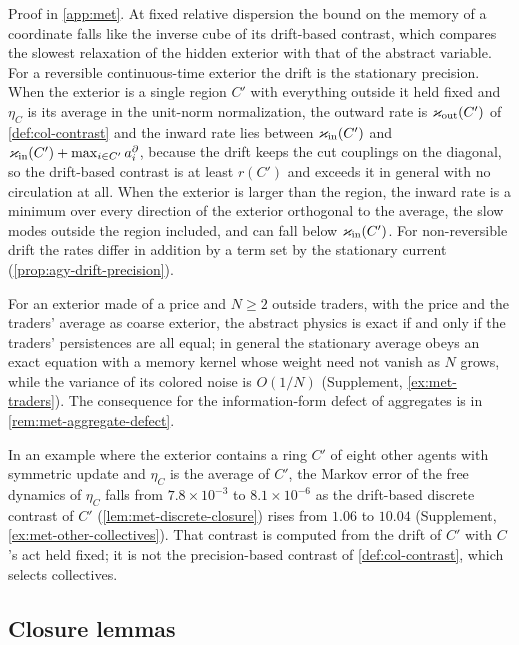 Proof in \cref{app:met}. At fixed relative dispersion the bound on the memory of a coordinate falls like the inverse cube of its drift-based contrast, which compares the slowest relaxation of the hidden exterior with that of the abstract variable. For a reversible continuous-time exterior the drift is the stationary precision. When the exterior is a single region $C'$ with everything outside it held fixed and $\eta_C$ is its average in the unit-norm normalization, the outward rate is $\varkappa_{\mathrm{out}}(C')$ of \cref{def:col-contrast} and the inward rate lies between $\varkappa_{\mathrm{in}}(C')$ and $\varkappa_{\mathrm{in}}(C')+\max_{i\in C'}a^\partial_i$, because the drift keeps the cut couplings on the diagonal, so the drift-based contrast is at least $r(C')$ and exceeds it in general with no circulation at all. When the exterior is larger than the region, the inward rate is a minimum over every direction of the exterior orthogonal to the average, the slow modes outside the region included, and can fall below $\varkappa_{\mathrm{in}}(C')$. For non-reversible drift the rates differ in addition by a term set by the stationary current (\cref{prop:agy-drift-precision}).

For an exterior made of a price and $N\ge2$ outside traders, with the price and the traders' average as coarse exterior, the abstract physics is exact if and only if the traders' persistences are all equal; in general the stationary average obeys an exact equation with a memory kernel whose weight need not vanish as $N$ grows, while the variance of its colored noise is $O(1/N)$ (Supplement, \cref{ex:met-traders}). The consequence for the information-form defect of aggregates is in \cref{rem:met-aggregate-defect}.

In an example where the exterior contains a ring $C'$ of eight other agents with symmetric update and $\eta_C$ is the average of $C'$, the Markov error of the free dynamics of $\eta_C$ falls from $7.8\times10^{-3}$ to $8.1\times10^{-6}$ as the drift-based discrete contrast of $C'$ (\cref{lem:met-discrete-closure}) rises from $1.06$ to $10.04$ (Supplement, \cref{ex:met-other-collectives}). That contrast is computed from the drift of $C'$ with $C$'s act held fixed; it is not the precision-based contrast of \cref{def:col-contrast}, which selects collectives.

\subsection{Closure lemmas}\label{sec:met-lemmas}

